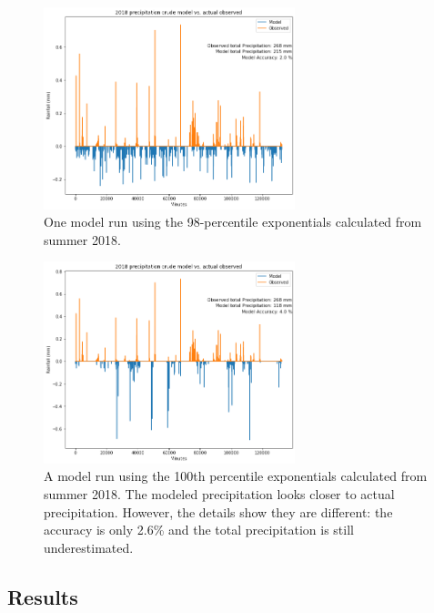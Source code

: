 \documentclass[11pt]{report}
\begin{document}
\clearpage
\begin{figure}[t]
  \centering
  \includegraphics[width=0.65\textwidth]{Figures/better_one_run.png}
  \caption[First run using Summer 2018 climatology] {\label{crudemodel} One
    model run using the 98-percentile exponentials calculated from summer
    2018.}
\end{figure}
\begin{figure}[b]
  \centering
  \includegraphics[width=0.65\textwidth]{Figures/best_one_run.png}
  \caption[Modified run using Summer 2018 climatology] {\label{crudermodel}
    A model run using the 100th percentile exponentials calculated from
    summer 2018. The modeled precipitation looks closer to actual
    precipitation. However, the details show they are different: the
    accuracy is only 2.6\% and the total precipitation is still
    underestimated.}
\end{figure}

\clearpage

\subsection{Results}\label{sec:sfp_r}
\end{document}
